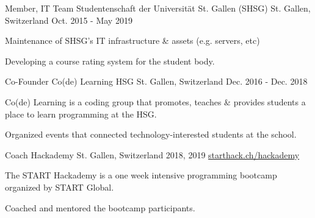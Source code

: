 

\begin{cventries}

  \cventry
    {Member, IT Team} %
    {Studentenschaft der Universität St. Gallen (SHSG)} %
    {St. Gallen, Switzerland} %
    {Oct. 2015 - May 2019} %
    {} %
    {
      \begin{cvitems} %
        \item {Maintenance of SHSG's IT infrastructure \& assets (e.g. servers, etc)}
        \item {Developing a course rating system for the student body.}
      \end{cvitems}
    }
  \cventry
    {Co-Founder} %
    {Co(de) Learning HSG} %
    {St. Gallen, Switzerland} %
    {Dec. 2016 - Dec. 2018} %
    {} %
    {
      \begin{cvitems} %
        \item {Co(de) Learning is a coding group that promotes, teaches \& provides students a place to learn programming at the HSG.}
        \item {Organized events that connected technology-interested students at the school.}
      \end{cvitems}
    }

    \cventry
      {Coach} %
      {Hackademy} %
      {St. Gallen, Switzerland} %
      {2018, 2019} %
      {\href{https://starthack.ch/hackademy/}{starthack.ch/hackademy}} %
      {
        \begin{cvitems} %
          \item {The START Hackademy is a one week intensive programming bootcamp organized by START Global.}
          \item {Coached and mentored the bootcamp participants.}
        \end{cvitems}
      }




\end{cventries}

